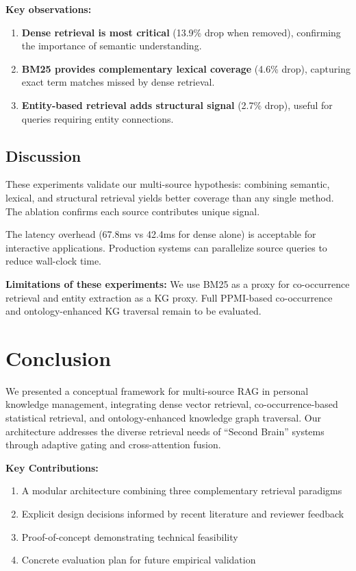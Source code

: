 \documentclass[11pt,a4paper]{article}
\begin{document}
\textbf{Key observations:}
\begin{enumerate}
    \item \textbf{Dense retrieval is most critical} (13.9\% drop when removed), confirming the importance of semantic understanding.
    \item \textbf{BM25 provides complementary lexical coverage} (4.6\% drop), capturing exact term matches missed by dense retrieval.
    \item \textbf{Entity-based retrieval adds structural signal} (2.7\% drop), useful for queries requiring entity connections.
\end{enumerate}

\subsection{Discussion}

These experiments validate our multi-source hypothesis: combining semantic, lexical, and structural retrieval yields better coverage than any single method. The ablation confirms each source contributes unique signal.

The latency overhead (67.8ms vs 42.4ms for dense alone) is acceptable for interactive applications. Production systems can parallelize source queries to reduce wall-clock time.

\textbf{Limitations of these experiments:} We use BM25 as a proxy for co-occurrence retrieval and entity extraction as a KG proxy. Full PPMI-based co-occurrence and ontology-enhanced KG traversal remain to be evaluated.

\section{Conclusion}
\label{sec:conclusion}

We presented a conceptual framework for multi-source RAG in personal knowledge management, integrating dense vector retrieval, co-occurrence-based statistical retrieval, and ontology-enhanced knowledge graph traversal. Our architecture addresses the diverse retrieval needs of ``Second Brain'' systems through adaptive gating and cross-attention fusion.

\textbf{Key Contributions:}
\begin{enumerate}
    \item A modular architecture combining three complementary retrieval paradigms
    \item Explicit design decisions informed by recent literature and reviewer feedback
    \item Proof-of-concept demonstrating technical feasibility
    \item Concrete evaluation plan for future empirical validation
\end{enumerate}
\end{document}
